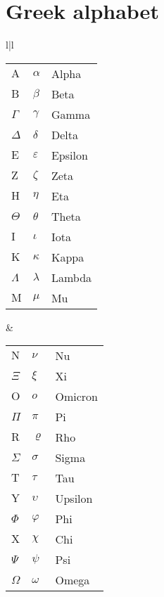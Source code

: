 \newpage
\section{Greek alphabet}

\begin{tabular}{l|l}
\begin{tabular}[t]{lll}
$\mathrm A$ & $\alpha$   & Alpha\\
$\mathrm B$ & $\beta$    & Beta\\
$\Gamma$    & $\gamma$   & Gamma\\
$\Delta$    & $\delta$   & Delta\\
\noalign{\vspace{1em}}
$\mathrm E$ & $\varepsilon$ & Epsilon\\
$\mathrm Z$ & $\zeta$    & Zeta\\
$\mathrm H$ & $\eta$     & Eta\\
$\Theta$    & $\theta$   & Theta\\
\noalign{\vspace{1em}}
$\mathrm I$ & $\iota$    & Iota\\
$\mathrm K$ & $\kappa$   & Kappa\\
$\Lambda$   & $\lambda$  & Lambda\\
$\mathrm M$ & $\mu$      & Mu
\end{tabular}
&
\begin{tabular}[t]{lll}
$\mathrm N$ & $\nu$      & Nu\\
$\Xi$       & $\xi$      & Xi\\
$\mathrm O$ & $o$        & Omicron\\
$\Pi$       & $\pi$      & Pi\\
\noalign{\vspace{1em}}
$\mathrm R$ & $\varrho$  & Rho\\
$\Sigma$    & $\sigma$   & Sigma\\
$\mathrm T$ & $\tau$     & Tau\\
$\mathrm Y$ & $\upsilon$ & Upsilon\\
\noalign{\vspace{1em}}
$\Phi$      & $\varphi$  & Phi\\
$\mathrm X$ & $\chi$     & Chi\\
$\Psi$      & $\psi$     & Psi\\
$\Omega$    & $\omega$   & Omega 
\end{tabular}
\end{tabular}

